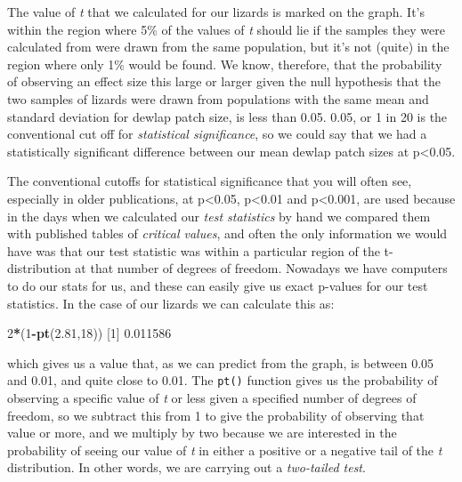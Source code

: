 \documentclass[
]{book}
\newenvironment{Shaded}{\begin{snugshade}}{\end{snugshade}}
\newcommand{\DecValTok}[1]{\textcolor[rgb]{0.00,0.00,0.81}{#1}}
\newcommand{\FloatTok}[1]{\textcolor[rgb]{0.00,0.00,0.81}{#1}}
\newcommand{\KeywordTok}[1]{\textcolor[rgb]{0.13,0.29,0.53}{\textbf{#1}}}
\newcommand{\NormalTok}[1]{#1}
\newcommand{\OperatorTok}[1]{\textcolor[rgb]{0.81,0.36,0.00}{\textbf{#1}}}
\begin{document}
The value of \emph{t} that we calculated for our lizards is marked on the graph. It's within the region where 5\% of the values of \emph{t} should lie if the samples they were calculated from were drawn from the same population, but it's not (quite) in the region where only 1\% would be found. We know, therefore, that the probability of observing an effect size this large or larger given the null hypothesis that the two samples of lizards were drawn from populations with the same mean and standard deviation for dewlap patch size, is less than 0.05. 0.05, or 1 in 20 is the conventional cut off for \emph{statistical significance}, so we could say that we had a statistically significant difference between our mean dewlap patch sizes at p\textless0.05.

The conventional cutoffs for statistical significance that you will often see, especially in older publications, at p\textless0.05, p\textless0.01 and p\textless0.001, are used because in the days when we calculated our \emph{test statistics} by hand we compared them with published tables of \emph{critical values}, and often the only information we would have was that our test statistic was within a particular region of the t-distribution at that number of degrees of freedom. Nowadays we have computers to do our stats for us, and these can easily give us exact p-values for our test statistics. In the case of our lizards we can calculate this as:

\begin{Shaded}
\begin{Highlighting}[]
\DecValTok{2}\OperatorTok{*}\NormalTok{(}\DecValTok{1}\OperatorTok{-}\KeywordTok{pt}\NormalTok{(}\FloatTok{2.81}\NormalTok{,}\DecValTok{18}\NormalTok{))}
\NormalTok{[}\DecValTok{1}\NormalTok{] }\FloatTok{0.011586}
\end{Highlighting}
\end{Shaded}

which gives us a value that, as we can predict from the graph, is between 0.05 and 0.01, and quite close to 0.01. The \texttt{pt()} function gives us the probability of observing a specific value of \emph{t} or less given a specified number of degrees of freedom, so we subtract this from 1 to give the probability of observing that value or more, and we multiply by two because we are interested in the probability of seeing our value of \emph{t} in either a positive or a negative tail of the \emph{t} distribution. In other words, we are carrying out a \emph{two-tailed test}.
\end{document}
